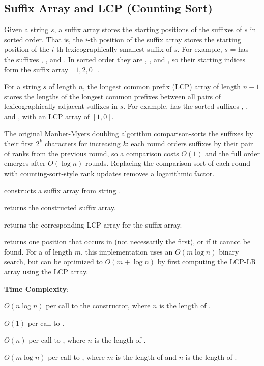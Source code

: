 \subsection{Suffix Array and LCP (Counting Sort)}
\label{sec:3.4.2}
Given a string $s$, a suffix array stores the starting positions of the suffixes of $s$ in sorted order. That is, the $i$-th position of the suffix array stores the starting position of the $i$-th lexicographically smallest suffix of $s$. For example, $s$ =  has the suffixes , , and . In sorted order they are , , and , so their starting indices form the suffix array $[1, 2, 0]$.

For a string $s$ of length $n$, the longest common prefix (LCP) array of length $n - 1$ stores the lengths of the longest common prefixes between all pairs of lexicographically adjacent suffixes in $s$. For example,  has the sorted suffixes , , and , with an LCP array of $[1, 0]$.

The original Manber-Myers doubling algorithm comparison-sorts the suffixes by their first $2^k$ characters for increasing $k$: each round orders suffixes by their pair of ranks from the previous round, so a comparison costs $O(1)$ and the full order emerges after $O(\log n)$ rounds. Replacing the comparison sort of each round with counting-sort-style rank updates removes a logarithmic factor.

\begin{compactitem}
  \item {} constructs a suffix array from string .
  \item {} returns the constructed suffix array.
  \item {} returns the corresponding LCP array for the suffix array.
  \item {} returns one position that  occurs in  (not necessarily the first), or  if it cannot be found. For a  of length $m$, this implementation uses an $O(m \log n)$ binary search, but can be optimized to $O(m + \log n)$ by first computing the LCP-LR array using the LCP array.
\end{compactitem}

\textbf{Time Complexity}:
\begin{compactitem}
  \item $O(n \log n)$ per call to the constructor, where $n$ is the length of .
  \item $O(1)$ per call to .
  \item $O(n)$ per call to , where $n$ is the length of .
  \item $O(m \log n)$ per call to , where $m$ is the length of  and $n$ is the length of .
\end{compactitem}

